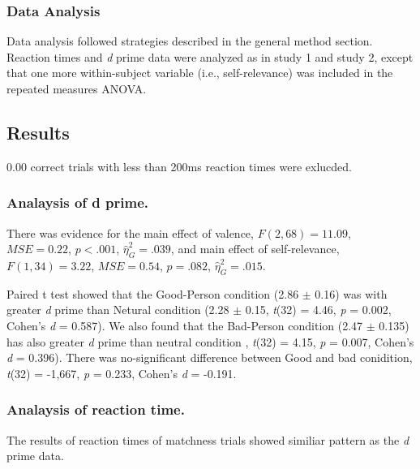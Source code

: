 \documentclass[man]{apa6}
\begin{document}
\hypertarget{data-analysis-4}{%
\subsubsection{Data Analysis}\label{data-analysis-4}}

Data analysis followed strategies described in the general method section. Reaction times and \emph{d} prime data were analyzed as in study 1 and study 2, except that one more within-subject variable (i.e., self-relevance) was included in the repeated measures ANOVA.

\hypertarget{results-4}{%
\subsection{Results}\label{results-4}}

0.00 correct trials with less than 200ms reaction times were exlucded.

\hypertarget{analaysis-of-d-prime.-3}{%
\subsubsection{Analaysis of d prime.}\label{analaysis-of-d-prime.-3}}

There was evidence for the main effect of valence, \(F(2, 68) = 11.09\), \(\mathit{MSE} = 0.22\), \(p < .001\), \(\hat{\eta}^2_G = .039\), and main effect of self-relevance, \(F(1, 34) = 3.22\), \(\mathit{MSE} = 0.54\), \(p = .082\), \(\hat{\eta}^2_G = .015\).

Paired t test showed that the Good-Person condition (2.86 \(\pm\) 0.16) was with greater \emph{d} prime than Netural condition (2.28 \(\pm\) 0.15, \emph{t}(32) = 4.46, \emph{p} = 0.002, Cohen's \emph{d} = 0.587). We also found that the Bad-Person condition (2.47 \(\pm\) 0.135) has also greater \emph{d} prime than neutral condition , \emph{t}(32) = 4.15, \emph{p} = 0.007, Cohen's \emph{d} = 0.396). There was no-significant difference between Good and bad conidition, \emph{t}(32) = -1,667, \emph{p} = 0.233, Cohen's \emph{d} = -0.191.

\hypertarget{analaysis-of-reaction-time.-3}{%
\subsubsection{Analaysis of reaction time.}\label{analaysis-of-reaction-time.-3}}

The results of reaction times of matchness trials showed similiar pattern as the \emph{d} prime data.
\end{document}
